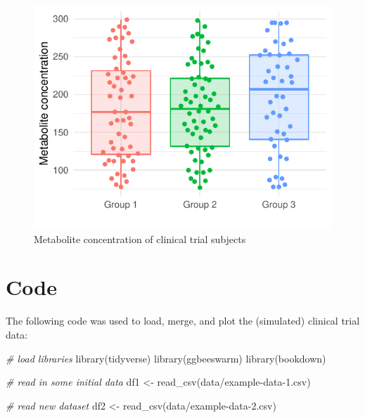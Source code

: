 \documentclass[smallextended]{svjour3}       %
\newenvironment{Shaded}{\begin{snugshade}}{\end{snugshade}}
\newcommand{\CommentTok}[1]{\textcolor[rgb]{0.56,0.35,0.01}{\textit{#1}}}
\newcommand{\FunctionTok}[1]{\textcolor[rgb]{0.00,0.00,0.00}{#1}}
\newcommand{\NormalTok}[1]{#1}
\newcommand{\OtherTok}[1]{\textcolor[rgb]{0.56,0.35,0.01}{#1}}
\newcommand{\StringTok}[1]{\textcolor[rgb]{0.31,0.60,0.02}{#1}}
\begin{document}
\begin{figure}
\centering
\includegraphics{computed_manuscript_files/figure-latex/plot-data-1.pdf}
\caption{\label{fig:plot-data}Metabolite concentration of clinical trial subjects}
\end{figure}

\hypertarget{code}{%
\section{Code}\label{code}}

The following code was used to load, merge, and plot the (simulated) clinical trial data:

\begin{Shaded}
\begin{Highlighting}[]
\CommentTok{\# load libraries}
\FunctionTok{library}\NormalTok{(tidyverse)}
\FunctionTok{library}\NormalTok{(ggbeeswarm)}
\FunctionTok{library}\NormalTok{(bookdown)}
\end{Highlighting}
\end{Shaded}

\begin{Shaded}
\begin{Highlighting}[]
\CommentTok{\# read in some initial data}
\NormalTok{df1 }\OtherTok{\textless{}{-}} \FunctionTok{read\_csv}\NormalTok{(}\StringTok{\textquotesingle{}data/example{-}data{-}1.csv\textquotesingle{}}\NormalTok{)}
\end{Highlighting}
\end{Shaded}

\begin{Shaded}
\begin{Highlighting}[]
\CommentTok{\# read new dataset}
\NormalTok{df2 }\OtherTok{\textless{}{-}} \FunctionTok{read\_csv}\NormalTok{(}\StringTok{\textquotesingle{}data/example{-}data{-}2.csv\textquotesingle{}}\NormalTok{)}
\end{Highlighting}
\end{Shaded}
\end{document}
